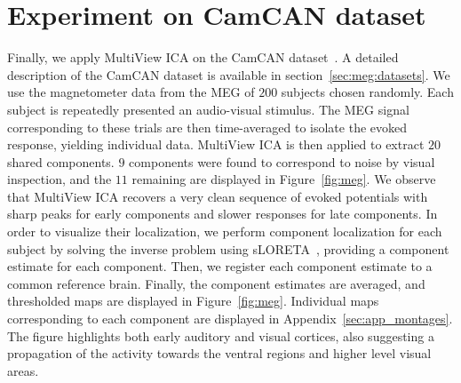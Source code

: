 \section{Experiment on CamCAN dataset}
Finally, we apply MultiView ICA on the CamCAN
dataset~\cite{taylor2017cambridge}. A detailed description of the CamCAN dataset
is available in section~\ref{sec:meg:datasets}. We use the magnetometer data from the MEG of
$200$ subjects chosen randomly.
%
Each subject is repeatedly presented an audio-visual stimulus. 
%
The MEG signal corresponding to these trials are then time-averaged to isolate the evoked response, yielding individual data.
%
MultiView ICA is then applied to extract $20$ shared components.
%
$9$ components were found to correspond to noise by visual inspection, and the $11$ remaining are displayed in Figure~\ref{fig:meg}.
%
We observe that MultiView ICA recovers a very clean sequence of evoked potentials with sharp peaks
for early components and slower responses for late components.
%
In order to visualize their localization, we perform component localization for each subject by solving the inverse problem using sLORETA~\cite{pascual2002standardized}, providing a component estimate for each component.
%
Then, we register each component estimate to a common reference brain.
%
Finally, the component estimates are averaged, and thresholded maps are displayed in Figure~\ref{fig:meg}.
%
Individual maps corresponding to each component are displayed in Appendix~\ref{sec:app_montages}.
The figure highlights both early auditory and visual cortices, also suggesting a propagation
of the activity towards the ventral regions and higher level visual areas.

